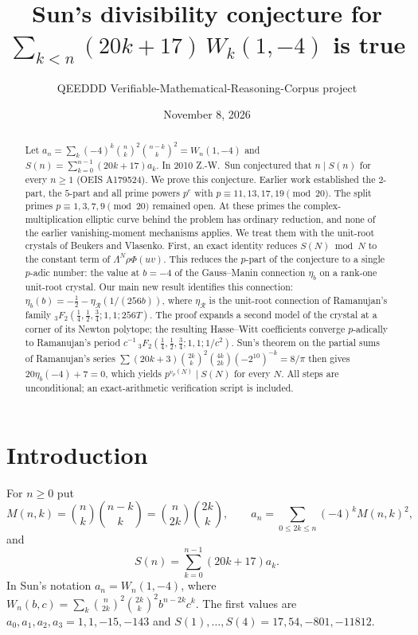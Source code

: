 \documentclass[11pt]{amsart}
\title[Sun's conjecture for $\sum(20k+17)W_k(1,-4)$]{Sun's divisibility conjecture for
$\sum_{k<n}(20k+17)\,W_k(1,-4)$ is true}
\author{QEEDDD Verifiable-Mathematical-Reasoning-Corpus project}
\date{November 8, 2026}
\theoremstyle{definition}
\theoremstyle{remark}
\begin{document}
\begin{abstract}
Let $a_n=\sum_{k}(-4)^k\binom nk^2\binom{n-k}k^2=W_n(1,-4)$ and
$S(n)=\sum_{k=0}^{n-1}(20k+17)a_k$. In 2010 Z.-W.~Sun conjectured that $n\mid S(n)$ for every
$n\ge1$ (OEIS A179524). We prove this conjecture. Earlier work established the $2$-part, the
$5$-part and all prime powers $p^e$ with $p\equiv11,13,17,19\pmod{20}$. The split primes
$p\equiv1,3,7,9\pmod{20}$ remained open. At these primes the complex-multiplication elliptic curve behind the
problem has ordinary reduction, and none of the earlier vanishing-moment mechanisms applies.
We treat them with the unit-root crystals of Beukers and Vlasenko. First, an exact identity
reduces $S(N)\bmod N$ to the constant term of $\Lambda^N\rho\Phi(uv)$. This reduces the $p$-part of
the conjecture to a single $p$-adic number: the value at $b=-4$ of the Gauss--Manin connection
$\eta_b$ on a rank-one unit-root crystal. Our main new result identifies this connection:
$\eta_b(b)=-\tfrac12-\eta_{\mathcal R}(1/(256b))$, where $\eta_{\mathcal R}$ is the
unit-root connection of Ramanujan's family
${}_3F_2(\tfrac14,\tfrac12,\tfrac34;1,1;256T)$. The proof expands a second
model of the crystal at a corner of its Newton polytope; the resulting Hasse--Witt coefficients
converge $p$-adically to Ramanujan's period $c^{-1}\,{}_3F_2(\tfrac14,\tfrac12,\tfrac34;1,1;1/c^{2})$.
Sun's theorem on the partial sums of Ramanujan's series
$\sum(20k+3)\binom{2k}k^2\binom{4k}{2k}(-2^{10})^{-k}=8/\pi$ then gives
$20\eta_b(-4)+7=0$, which yields $p^{v_p(N)}\mid S(N)$ for every $N$. All steps are unconditional;
an exact-arithmetic verification script is included.
\end{abstract}

\maketitle

\tableofcontents

\section{Introduction}

For $n\ge0$ put
\[
 M(n,k)=\binom nk\binom{n-k}k=\binom n{2k}\binom{2k}k,\qquad
 a_n=\sum_{0\le2k\le n}(-4)^kM(n,k)^2,
\]
and
\[
 S(n)=\sum_{k=0}^{n-1}(20k+17)a_k .
\]
In Sun's notation $a_n=W_n(1,-4)$, where $W_n(b,c)=\sum_k\binom n{2k}^2\binom{2k}k^2b^{n-2k}c^k$.
The first values are $a_0,a_1,a_2,a_3=1,1,-15,-143$ and $S(1),\dots,S(4)=17,54,-801,-11812$.
\end{document}
